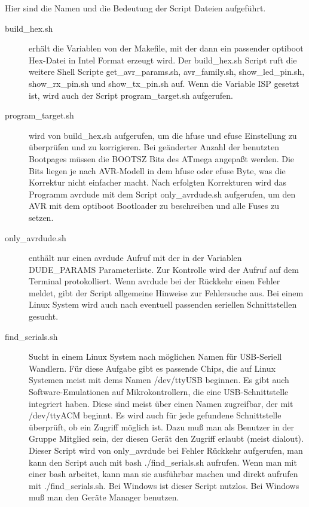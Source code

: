 Hier sind die Namen und die Bedeutung der Script Dateien aufgeführt.
\begin{description}

\item [build\_hex.sh] erhält die Variablen von der Makefile, mit der dann ein passender
optiboot Hex-Datei in Intel Format erzeugt wird.
Der build\_hex.sh Script ruft die weitere Shell Scripte  get\_avr\_params.sh,
avr\_family.sh, show\_led\_pin.sh, show\_rx\_pin.sh und show\_tx\_pin.sh auf.
Wenn die Variable ISP gesetzt ist, wird auch der Script program\_target.sh
aufgerufen.

\item [program\_target.sh] wird von build\_hex.sh aufgerufen, um die hfuse und efuse Einstellung
zu überprüfen und zu korrigieren. Bei geänderter Anzahl der benutzten Bootpages
müssen die BOOTSZ Bits des ATmega angepaßt werden. Die Bits liegen je nach AVR-Modell
in dem hfuse oder efuse Byte, was die Korrektur nicht einfacher macht.
Nach erfolgten Korrekturen wird das Programm avrdude mit dem Script only\_avrdude.sh aufgerufen,
um den AVR mit dem optiboot Bootloader zu beschreiben und alle Fuses zu setzen.

\item [only\_avrdude.sh] enthält nur einen avrdude Aufruf mit der in der Variablen
DUDE\_PARAMS Parameterliste. Zur Kontrolle wird der Aufruf auf dem Terminal protokolliert.
Wenn avrdude bei der Rückkehr einen Fehler meldet, gibt der Script allgemeine Hinweise
zur Fehlersuche aus. Bei einem Linux System wird auch nach eventuell passenden 
seriellen Schnittstellen gesucht.

\item [find\_serials.sh] Sucht in einem Linux System nach möglichen Namen für USB-Seriell
Wandlern. Für diese Aufgabe gibt es passende Chips, die auf Linux Systemen meist mit dems
Namen /dev/ttyUSB beginnen.
Es gibt auch Software-Emulationen auf Mikrokontrollern, die eine USB-Schnittstelle
integriert haben. Diese sind meist über einen Namen zugreifbar, der mit /dev/ttyACM beginnt.
Es wird auch für jede gefundene Schnittstelle überprüft, ob ein Zugriff möglich ist.
Dazu muß man als Benutzer in der Gruppe Mitglied sein, der diesen Gerät den Zugriff
erlaubt (meist dialout).
Dieser Script wird von only\_avrdude bei Fehler Rückkehr aufgerufen, man kann den
Script auch mit bash ./find\_serials.sh aufrufen.
Wenn man mit einer bash arbeitet, kann man sie ausführbar machen und direkt aufrufen
mit ./find\_serials.sh.
Bei Windows ist dieser Script nutzlos. Bei Windows muß man den Geräte Manager benutzen.


\end{description}
